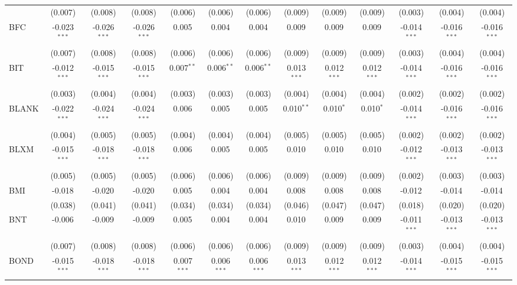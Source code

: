 \begin{table}[!htbp]
\begin{tabular}{@{\extracolsep{5pt}}lcccccccccccc}
  & (0.007) & (0.008) & (0.008) & (0.006) & (0.006) & (0.006) & (0.009) & (0.009) & (0.009) & (0.003) & (0.004) & (0.004) \\
 BFC & -0.023$^{***}$ & -0.026$^{***}$ & -0.026$^{***}$ & 0.005$^{}$ & 0.004$^{}$ & 0.004$^{}$ & 0.009$^{}$ & 0.009$^{}$ & 0.009$^{}$ & -0.014$^{***}$ & -0.016$^{***}$ & -0.016$^{***}$ \\
  & (0.007) & (0.008) & (0.008) & (0.006) & (0.006) & (0.006) & (0.009) & (0.009) & (0.009) & (0.003) & (0.004) & (0.004) \\
 BIT & -0.012$^{***}$ & -0.015$^{***}$ & -0.015$^{***}$ & 0.007$^{**}$ & 0.006$^{**}$ & 0.006$^{**}$ & 0.013$^{***}$ & 0.012$^{***}$ & 0.012$^{***}$ & -0.014$^{***}$ & -0.016$^{***}$ & -0.016$^{***}$ \\
  & (0.003) & (0.004) & (0.004) & (0.003) & (0.003) & (0.003) & (0.004) & (0.004) & (0.004) & (0.002) & (0.002) & (0.002) \\
 BLANK & -0.022$^{***}$ & -0.024$^{***}$ & -0.024$^{***}$ & 0.006$^{}$ & 0.005$^{}$ & 0.005$^{}$ & 0.010$^{**}$ & 0.010$^{*}$ & 0.010$^{*}$ & -0.014$^{***}$ & -0.016$^{***}$ & -0.016$^{***}$ \\
  & (0.004) & (0.005) & (0.005) & (0.004) & (0.004) & (0.004) & (0.005) & (0.005) & (0.005) & (0.002) & (0.002) & (0.002) \\
 BLXM & -0.015$^{***}$ & -0.018$^{***}$ & -0.018$^{***}$ & 0.006$^{}$ & 0.005$^{}$ & 0.005$^{}$ & 0.010$^{}$ & 0.010$^{}$ & 0.010$^{}$ & -0.012$^{***}$ & -0.013$^{***}$ & -0.013$^{***}$ \\
  & (0.005) & (0.005) & (0.005) & (0.006) & (0.006) & (0.006) & (0.009) & (0.009) & (0.009) & (0.002) & (0.003) & (0.003) \\
 BMI & -0.018$^{}$ & -0.020$^{}$ & -0.020$^{}$ & 0.005$^{}$ & 0.004$^{}$ & 0.004$^{}$ & 0.008$^{}$ & 0.008$^{}$ & 0.008$^{}$ & -0.012$^{}$ & -0.014$^{}$ & -0.014$^{}$ \\
  & (0.038) & (0.041) & (0.041) & (0.034) & (0.034) & (0.034) & (0.046) & (0.047) & (0.047) & (0.018) & (0.020) & (0.020) \\
 BNT & -0.006$^{}$ & -0.009$^{}$ & -0.009$^{}$ & 0.005$^{}$ & 0.004$^{}$ & 0.004$^{}$ & 0.010$^{}$ & 0.009$^{}$ & 0.009$^{}$ & -0.011$^{***}$ & -0.013$^{***}$ & -0.013$^{***}$ \\
  & (0.007) & (0.008) & (0.008) & (0.006) & (0.006) & (0.006) & (0.009) & (0.009) & (0.009) & (0.003) & (0.004) & (0.004) \\
 BOND & -0.015$^{***}$ & -0.018$^{***}$ & -0.018$^{***}$ & 0.007$^{***}$ & 0.006$^{***}$ & 0.006$^{***}$ & 0.013$^{***}$ & 0.012$^{***}$ & 0.012$^{***}$ & -0.014$^{***}$ & -0.015$^{***}$ & -0.015$^{***}$ \\

\end{tabular}
\end{table}

